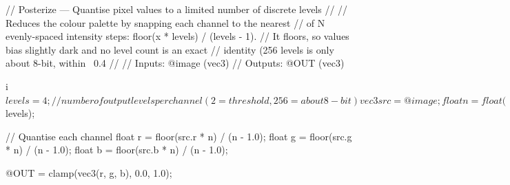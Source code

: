 // Posterize — Quantise pixel values to a limited number of discrete levels
//
// Reduces the colour palette by snapping each channel to the nearest
// of N evenly-spaced intensity steps: floor(x * levels) / (levels - 1).
// It floors, so values bias slightly dark and no level count is an exact
// identity (256 levels is only about 8-bit, within ~0.4%
//
// Inputs:  @image (vec3)
// Outputs: @OUT   (vec3)

i$levels = 4;   // number of output levels per channel (2 = threshold, 256 = about 8-bit)

vec3 src = @image;
float n = float($levels);

// Quantise each channel
float r = floor(src.r * n) / (n - 1.0);
float g = floor(src.g * n) / (n - 1.0);
float b = floor(src.b * n) / (n - 1.0);

@OUT = clamp(vec3(r, g, b), 0.0, 1.0);
